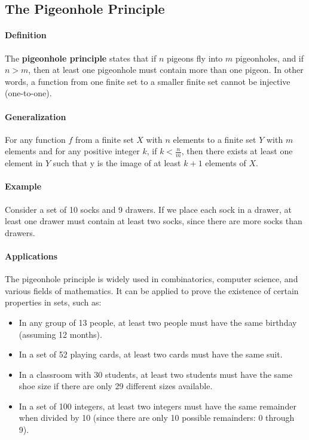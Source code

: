 \subsection{The Pigeonhole Principle}
\hrulefill
\paragraph*{Definition}
The \textbf{pigeonhole principle} states that if $n$ pigeons fly into $m$ pigeonholes, and if $n > m$, then at least one pigeonhole must contain more than one pigeon. 
In other words, a function from one finite set to a smaller finite set cannot be injective (one-to-one).

\paragraph*{Generalization}
For any function $f$ from a finite set $X$ with $n$ elements to a finite set $Y$ with $m$ elements and for any 
positive integer $k$, if $k < \frac{n}{m}$, then there exists at least one element in $Y$ such that y is the image
of at least $k + 1$ elements of $X$.

\paragraph*{Example}
Consider a set of 10 socks and 9 drawers. If we place each sock in a drawer, at least one drawer must contain at least two socks, since there are more socks than drawers.
\paragraph*{Applications}
The pigeonhole principle is widely used in combinatorics, computer science, and various fields of mathematics. It can be applied to prove the existence of certain properties in sets, such as:
\begin{itemize}
    \item In any group of 13 people, at least two people must have the same birthday (assuming 12 months).
    \item In a set of 52 playing cards, at least two cards must have the same suit.
    \item In a classroom with 30 students, at least two students must have the same shoe size if there are only 29 different sizes available.
    \item In a set of 100 integers, at least two integers must have the same remainder when divided by 10 (since there are only 10 possible remainders: 0 through 9).
\end{itemize}